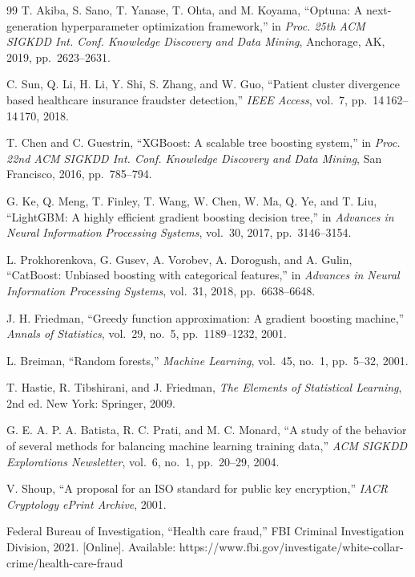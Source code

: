 \begin{thebibliography}{99}
T. Akiba, S. Sano, T. Yanase, T. Ohta, and M. Koyama,
``Optuna: A next-generation hyperparameter optimization framework,''
in \textit{Proc. 25th ACM SIGKDD Int. Conf. Knowledge Discovery and Data Mining},
Anchorage, AK, 2019, pp.~2623--2631.

C. Sun, Q. Li, H. Li, Y. Shi, S. Zhang, and W. Guo,
``Patient cluster divergence based healthcare insurance fraudster detection,''
\textit{IEEE Access}, vol.~7, pp.~14\,162--14\,170, 2018.

T. Chen and C. Guestrin,
``XGBoost: A scalable tree boosting system,''
in \textit{Proc. 22nd ACM SIGKDD Int. Conf. Knowledge Discovery and Data Mining},
San Francisco, 2016, pp.~785--794.

G. Ke, Q. Meng, T. Finley, T. Wang, W. Chen, W. Ma, Q. Ye, and T. Liu,
``LightGBM: A highly efficient gradient boosting decision tree,''
in \textit{Advances in Neural Information Processing Systems}, vol.~30, 2017, pp.~3146--3154.

L. Prokhorenkova, G. Gusev, A. Vorobev, A. Dorogush, and A. Gulin,
``CatBoost: Unbiased boosting with categorical features,''
in \textit{Advances in Neural Information Processing Systems}, vol.~31, 2018, pp.~6638--6648.

J. H. Friedman,
``Greedy function approximation: A gradient boosting machine,''
\textit{Annals of Statistics}, vol.~29, no.~5, pp.~1189--1232, 2001.

L. Breiman,
``Random forests,''
\textit{Machine Learning}, vol.~45, no.~1, pp.~5--32, 2001.

T. Hastie, R. Tibshirani, and J. Friedman,
\textit{The Elements of Statistical Learning}, 2nd ed.
New York: Springer, 2009.

G. E. A. P. A. Batista, R. C. Prati, and M. C. Monard,
``A study of the behavior of several methods for balancing machine learning training data,''
\textit{ACM SIGKDD Explorations Newsletter}, vol.~6, no.~1, pp.~20--29, 2004.

V. Shoup,
``A proposal for an ISO standard for public key encryption,''
\textit{IACR Cryptology ePrint Archive}, 2001.

Federal Bureau of Investigation,
``Health care fraud,'' FBI Criminal Investigation Division, 2021.
[Online]. Available: https://www.fbi.gov/investigate/white-collar-crime/health-care-fraud


\end{thebibliography}
